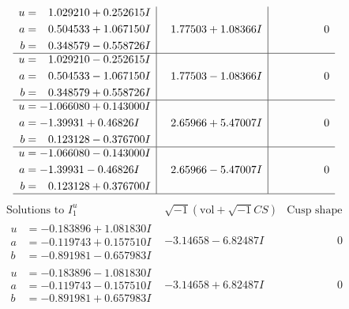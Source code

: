 \documentclass[1p]{elsarticle_modified}
\theoremstyle{definition}
\newcommand{\I}{\sqrt{-1}}
\begin{document}
$$\begin{array}{c|c|c}
\begin{aligned}
u &= \phantom{-}1.029210 + 0.252615 I \\
a &= \phantom{-}0.504533 + 1.067150 I \\
b &= \phantom{-}0.348579 - 0.558726 I\end{aligned}
 & \phantom{-}1.77503 + 1.08366 I & \phantom{-0.000000 } 0 \\ \hline\begin{aligned}
u &= \phantom{-}1.029210 - 0.252615 I \\
a &= \phantom{-}0.504533 - 1.067150 I \\
b &= \phantom{-}0.348579 + 0.558726 I\end{aligned}
 & \phantom{-}1.77503 - 1.08366 I & \phantom{-0.000000 } 0 \\ \hline\begin{aligned}
u &= -1.066080 + 0.143000 I \\
a &= -1.39931 + 0.46826 I \\
b &= \phantom{-}0.123128 - 0.376700 I\end{aligned}
 & \phantom{-}2.65966 + 5.47007 I & \phantom{-0.000000 } 0 \\ \hline\begin{aligned}
u &= -1.066080 - 0.143000 I \\
a &= -1.39931 - 0.46826 I \\
b &= \phantom{-}0.123128 + 0.376700 I\end{aligned}
 & \phantom{-}2.65966 - 5.47007 I & \phantom{-0.000000 } 0\\
 \hline 
 \end{array}$$\newpage$$\begin{array}{c|c|c}  
\text{Solutions to }I^u_{1}& \I (\text{vol} + \sqrt{-1}CS) & \text{Cusp shape}\\
 \hline 
\begin{aligned}
u &= -0.183896 + 1.081830 I \\
a &= -0.119743 + 0.157510 I \\
b &= -0.891981 - 0.657983 I\end{aligned}
 & -3.14658 - 6.82487 I & \phantom{-0.000000 } 0 \\ \hline\begin{aligned}
u &= -0.183896 - 1.081830 I \\
a &= -0.119743 - 0.157510 I \\
b &= -0.891981 + 0.657983 I\end{aligned}
 & -3.14658 + 6.82487 I & \phantom{-0.000000 } 0 \\ \hline\begin{aligned}

\end{aligned}
\end{array}$$
\end{document}

